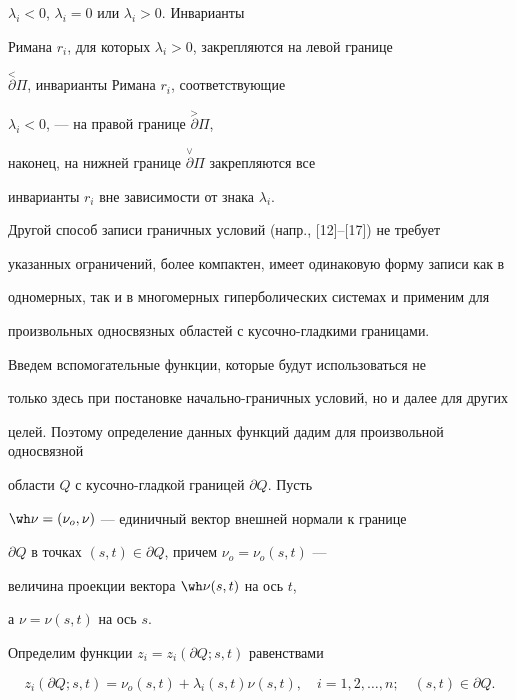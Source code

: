 $\lambda_i < 0$, $\lambda_i =0$ или $\lambda_i > 0$. Инварианты


Римана $r_i$, для которых $\lambda_i > 0$, закрепляются на левой границе


$\overset{<}{\partial}{}{\Pi}$, инварианты Римана $r_i$, соответствующие 


$\lambda_i < 0$, --- на правой границе $\overset{>}{\partial}{}{\Pi}$, 


наконец, на нижней границе $\overset{\vee}{\partial}{}{\Pi}$ закрепляются все


инварианты $r_i$ вне зависимости от знака $\lambda_i$.





Другой способ записи граничных условий (напр., [12]--[17]) не требует 


указанных ограничений, более компактен, имеет одинаковую форму записи как в 


одномерных, так и в многомерных гиперболических системах и применим для 


произвольных односвязных областей с кусочно-гладкими границами.





Введем вспомогательные функции, которые будут использоваться не 


только здесь при постановке начально-граничных условий, но и далее для других


целей. Поэтому определение данных функций дадим для произвольной односвязной


области $Q$ с кусочно-гладкой границей $\partial Q$. Пусть 


$\wh \nu=(\nu_o,\nu)$ --- единичный вектор внешней нормали к границе 


$\partial Q$ в точках $(s,t) \in \partial Q$, причем $\nu_o=\nu_o(s,t)$ --- 


величина проекции вектора $\wh \nu (s,t)$ на ось $t$,


а $\nu=\nu (s,t)$ на ось $s$.





Определим функции $z_i=z_i (\partial Q;s,t)$ равенствами


\begin{equation}


z_i(\partial Q;s,t)=\nu_o (s,t)+\lambda_i (s,t) \nu (s,t),


\quad i=1,2,\dotsc,n;\quad (s,t) \in \partial Q.


\end{equation}





